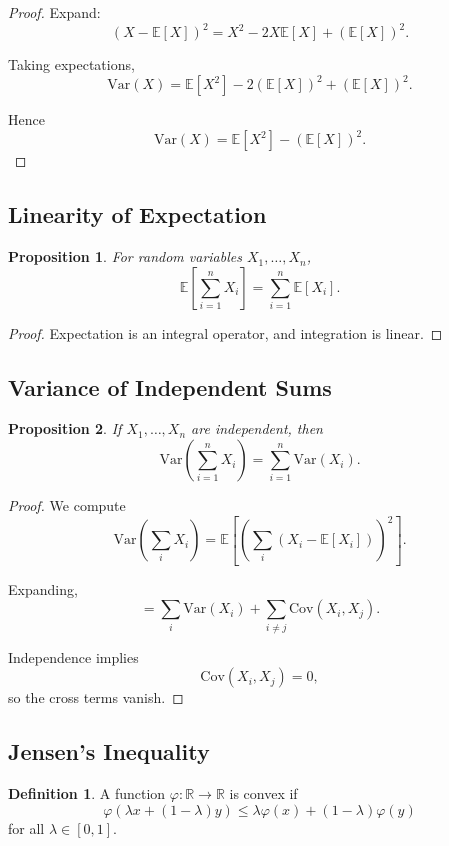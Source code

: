 \documentclass[12pt,oneside]{book}
\numberwithin{equation}{section}
\theoremstyle{definition}
\newtheorem{definition}{Definition}[section]
\theoremstyle{plain}
\newtheorem{proposition}{Proposition}[section]
\theoremstyle{remark}
\newcommand{\R}{\mathbb{R}}
\newcommand{\E}{\mathbb{E}}
\newcommand{\Var}{\mathrm{Var}}
\newcommand{\Cov}{\mathrm{Cov}}
\begin{document}
\begin{proof}
Expand:
\[
(X-\E[X])^2
=
X^2-2X\E[X]+(\E[X])^2.
\]

Taking expectations,
\[
\Var(X)
=
\E[X^2]
-
2(\E[X])^2
+
(\E[X])^2.
\]

Hence
\[
\Var(X)
=
\E[X^2]-(\E[X])^2.
\]
\end{proof}

\subsection{Linearity of Expectation}

\begin{proposition}
For random variables $X_1,\dots,X_n$,
\[
\E\left[\sum_{i=1}^n X_i\right]
=
\sum_{i=1}^n \E[X_i].
\]
\end{proposition}

\begin{proof}
Expectation is an integral operator, and integration is linear.
\end{proof}

\subsection{Variance of Independent Sums}

\begin{proposition}
If $X_1,\dots,X_n$ are independent, then
\[
\Var\left(\sum_{i=1}^n X_i\right)
=
\sum_{i=1}^n \Var(X_i).
\]
\end{proposition}

\begin{proof}
We compute
\[
\Var\left(\sum_i X_i\right)
=
\E\left[
\left(
\sum_i (X_i-\E[X_i])
\right)^2
\right].
\]

Expanding,
\[
=
\sum_i \Var(X_i)
+
\sum_{i\neq j}
\Cov(X_i,X_j).
\]

Independence implies
\[
\Cov(X_i,X_j)=0,
\]
so the cross terms vanish.
\end{proof}

\subsection{Jensen's Inequality}

\begin{definition}
A function $\varphi:\R\to\R$ is convex if
\[
\varphi(\lambda x+(1-\lambda)y)
\leq
\lambda\varphi(x)+(1-\lambda)\varphi(y)
\]
for all $\lambda\in[0,1]$.
\end{definition}
\end{document}
